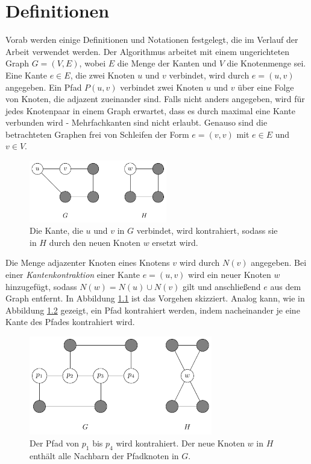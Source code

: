 \chapter{Definitionen}
\label{cha:definitionen}

Vorab werden einige Definitionen und Notationen festgelegt, die im Verlauf der Arbeit verwendet werden.
Der Algorithmus arbeitet mit einem ungerichteten Graph $G = (V, E)$, wobei $E$ die Menge der Kanten und $V$ die Knotenmenge sei.
Eine Kante $e \in E$, die zwei Knoten $u$ und $v$ verbindet, wird durch $e = (u, v)$ angegeben.
Ein Pfad $P(u, v)$ verbindet zwei Knoten $u$ und $v$ über eine Folge von Knoten, die adjazent zueinander sind.
Falls nicht anders angegeben, wird für jedes Knotenpaar in einem Graph erwartet, dass es durch maximal eine Kante verbunden wird - Mehrfachkanten sind nicht erlaubt.
Genauso sind die betrachteten Graphen frei von Schleifen der Form $e = (v, v)$ mit $e \in E$ und $v \in V$.
\begin{figure}
  \includegraphics[width=6cm]{bilder/Kantenkontraktion.pdf}
  \caption{Die Kante, die $u$ und $v$ in $G$ verbindet, wird kontrahiert, sodass sie in $H$ durch den neuen Knoten $w$ ersetzt wird.}
  \label{fig:Kantenkontraktion}
\end{figure}
Die Menge adjazenter Knoten eines Knotens $v$ wird durch $N(v)$ angegeben.
Bei einer \emph{Kantenkontraktion} einer Kante $e = (u, v)$ wird ein neuer Knoten $w$ hinzugefügt, sodass $N(w) = N(u) \cup N(v)$ gilt und anschließend $e$ aus dem Graph entfernt.
In Abbildung \ref{fig:Kantenkontraktion} ist das Vorgehen skizziert.
Analog kann, wie in Abbildung \ref{fig:Pfadkontraktion} gezeigt, ein Pfad kontrahiert werden, indem nacheinander je eine Kante des Pfades kontrahiert wird.
\begin{figure}[H]
  \centering
  \includegraphics[width=8cm]{bilder/Pfadkontraktion.pdf}
  \caption{Der Pfad von $p_1$ bis $p_4$ wird kontrahiert.
           Der neue Knoten $w$ in $H$ enthält alle Nachbarn der Pfadknoten in $G$.}
  \label{fig:Pfadkontraktion}
\end{figure}

